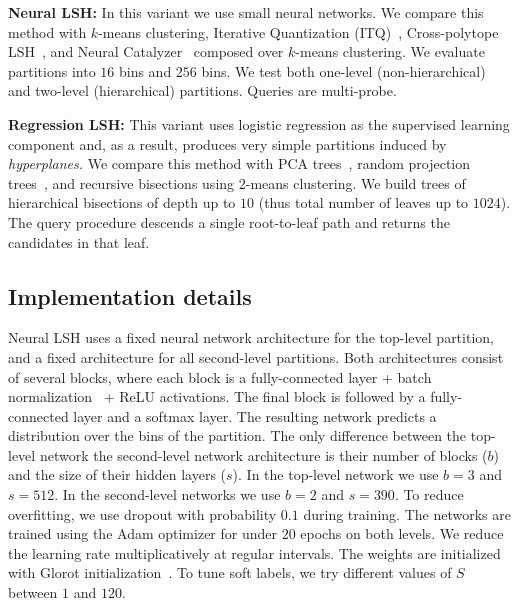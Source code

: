 \documentclass[11pt]{article}
\begin{document}
\begin{CompactItemize}
\item\textbf{Neural LSH:}
In this variant we use small neural networks.
We compare this method with $k$-means clustering, Iterative Quantization (ITQ)~\cite{gong2013iterative}, Cross-polytope LSH~\cite{andoni2015practical}, and Neural Catalyzer~\cite{sablayrolles2018spreading} composed over $k$-means clustering.
We evaluate partitions into $16$ bins and $256$ bins. 
We test both one-level (non-hierarchical) and two-level (hierarchical) partitions.
Queries are multi-probe.

\item\textbf{Regression LSH:} This variant uses logistic regression as the supervised learning component
and, as a result, produces very simple partitions induced by \emph{hyperplanes.}
We compare this method with PCA trees~\cite{sproull1991refinements,kumar2008good,abdullah2014spectral}, random projection trees~\cite{dasgupta2013randomized}, and recursive bisections using $2$-means clustering.
We build trees of hierarchical bisections of depth up to $10$ (thus total number of leaves up to $1024$).
The query procedure descends a single root-to-leaf path and returns the candidates in that leaf.
\end{CompactItemize}

\subsection{Implementation details}

Neural LSH uses a fixed neural network architecture for the top-level partition,
and a fixed architecture for all second-level partitions.
Both architectures consist of several blocks, where each block is a fully-connected layer + batch normalization~\cite{ioffe2015batch} + ReLU activations.
The final block is followed by a fully-connected layer and a softmax layer.
The resulting network predicts a distribution over the bins of the partition.
%
The only difference between the top-level network the second-level network architecture is their number of blocks ($b$) and the size of their hidden layers ($s$).
In the top-level network we use $b=3$ and $s=512$.
In the second-level networks we use $b=2$ and $s=390$.
%
%
To reduce overfitting, we use dropout with probability $0.1$ during training.
The networks are trained using the Adam optimizer \cite{adam2015} for under $20$ epochs on both levels. We reduce the learning rate multiplicatively at regular intervals. The weights are initialized with Glorot initialization~\cite{glorot2010}.
To tune soft labels, we try different values of $S$ between $1$ and $120$.
\end{document}
